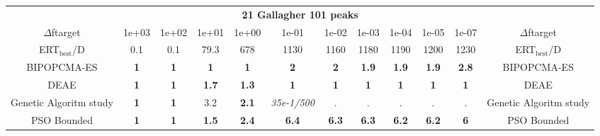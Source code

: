 \begin{tabular}{cccccccccccc}
 & \multicolumn{10}{c}{{\normalsize \textbf{21 Gallagher 101 peaks}}}\\
$\Delta$ftarget& 1e+03& 1e+02& 1e+01& 1e+00& 1e-01& 1e-02& 1e-03& 1e-04& 1e-05& 1e-07 & $\Delta$ftarget \\
ERT$_{\textrm{best}}$/D& 0.1& 0.1& 79.3& 678& 1130& 1160& 1180& 1190& 1200& 1230 & ERT$_{\textrm{best}}$/D \\
\hline
BIPOPCMA-ES & \textbf{1} & \textbf{1} & \textbf{1} & \textbf{1} & \textbf{2} & \textbf{2} & \textbf{1.9} & \textbf{1.9} & \textbf{1.9} & \textbf{2.8} & BIPOPCMA-ES \cite{add_an_entry_for_BIPOPCMA-ES_in_bbob.bib}\\
DEAE & \textbf{1} & \textbf{1} & \textbf{1.7} & \textbf{1.3} & \textbf{1} & \textbf{1} & \textbf{1} & \textbf{1} & \textbf{1} & \textbf{1} & DEAE \cite{add_an_entry_for_DEAE_in_bbob.bib}\\
Genetic Algoritm study & \textbf{1} & \textbf{1} & 3.2 & \textbf{2.1} & \textit{35e-1}\textit{/500} & . & . & . & . & . & Genetic Algoritm study \cite{add_an_entry_for_Genetic Algoritm study_in_bbob.bib}\\
PSO Bounded & \textbf{1} & \textbf{1} & \textbf{1.5} & \textbf{2.4} & \textbf{6.4} & \textbf{6.3} & \textbf{6.3} & \textbf{6.2} & \textbf{6.2} & \textbf{6} & PSO Bounded \cite{add_an_entry_for_PSO Bounded_in_bbob.bib}
\end{tabular}
